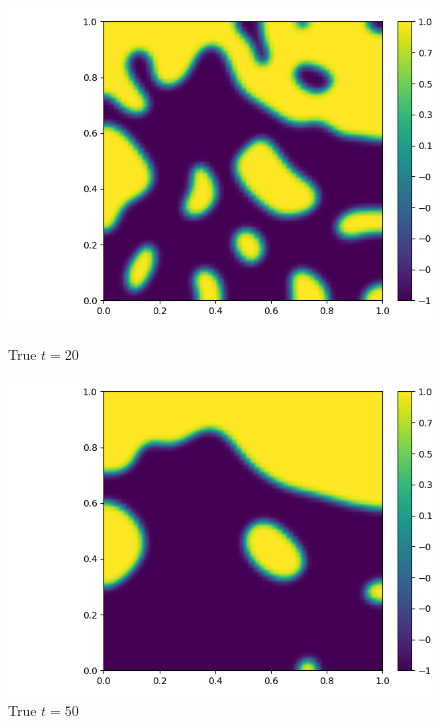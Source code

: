 \documentclass{article}
\begin{document}
\begin{figure}[H]
    \centering
    \begin{minipage}{0.5\textwidth}
       \centering
	  \includegraphics[width=\linewidth]{FEPics/Allen Cahn Test2_60x60_0.025_Target BE_EndTime=20.png}
	  \caption{True $t=20$}
    \end{minipage}\hfill
    \begin{minipage}{0.5\textwidth}
       \centering
	  \includegraphics[width=\linewidth]{FEPics/Allen Cahn Test2_60x60_0.025_Target BE_EndTime=50.png}
	  \caption{True $t=50$}
    \end{minipage}
\end{figure}
\end{document}
